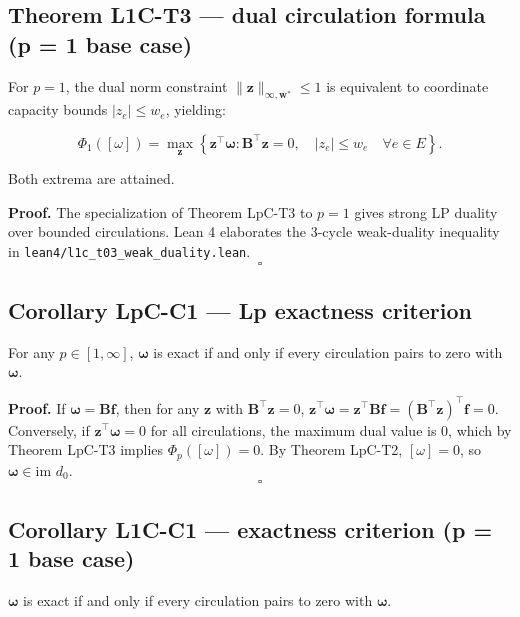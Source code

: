 \documentclass[
]{article}
\begin{document}
\subsection{Theorem L1C-T3 --- dual circulation formula (p = 1 base case)}\label{theorem-l1c-t3-dual-circulation-formula-p-1-base-case}

For \(p = 1\), the dual norm constraint \(\|\mathbf{z}\|_{\infty, \mathbf{w}^*} \le 1\) is equivalent to coordinate capacity bounds \(|z_e| \le w_e\), yielding:

\[\Phi_1([\omega]) = \max_{\mathbf{z}} \left\{ \mathbf{z}^\top \boldsymbol{\omega} : \mathbf{B}^\top \mathbf{z} = 0, \quad |z_e| \le w_e \quad \forall e \in E \right\}.\]

Both extrema are attained.

\textbf{Proof.} The specialization of Theorem LpC-T3 to \(p = 1\) gives strong LP duality over bounded circulations. Lean 4 elaborates the 3-cycle weak-duality inequality in \texttt{lean4/l1c\_t03\_weak\_duality.lean}. \[\square\]

\subsection{Corollary LpC-C1 --- Lp exactness criterion}\label{corollary-lpc-c1-lp-exactness-criterion}

For any \(p \in [1, \infty]\), \(\boldsymbol{\omega}\) is exact if and only if every circulation pairs to zero with \(\boldsymbol{\omega}\).

\textbf{Proof.} If \(\boldsymbol{\omega} = \mathbf{B}\mathbf{f}\), then for any \(\mathbf{z}\) with \(\mathbf{B}^\top \mathbf{z} = 0\), \(\mathbf{z}^\top \boldsymbol{\omega} = \mathbf{z}^\top \mathbf{B}\mathbf{f} = (\mathbf{B}^\top \mathbf{z})^\top \mathbf{f} = 0\).
Conversely, if \(\mathbf{z}^\top \boldsymbol{\omega} = 0\) for all circulations, the maximum dual value is 0, which by Theorem LpC-T3 implies \(\Phi_p([\omega]) = 0\).
By Theorem LpC-T2, \([\omega] = 0\), so \(\boldsymbol{\omega} \in \text{im } d_0\). \[\square\]

\subsection{Corollary L1C-C1 --- exactness criterion (p = 1 base case)}\label{corollary-l1c-c1-exactness-criterion-p-1-base-case}

\(\boldsymbol{\omega}\) is exact if and only if every circulation pairs to zero with \(\boldsymbol{\omega}\).
\end{document}
